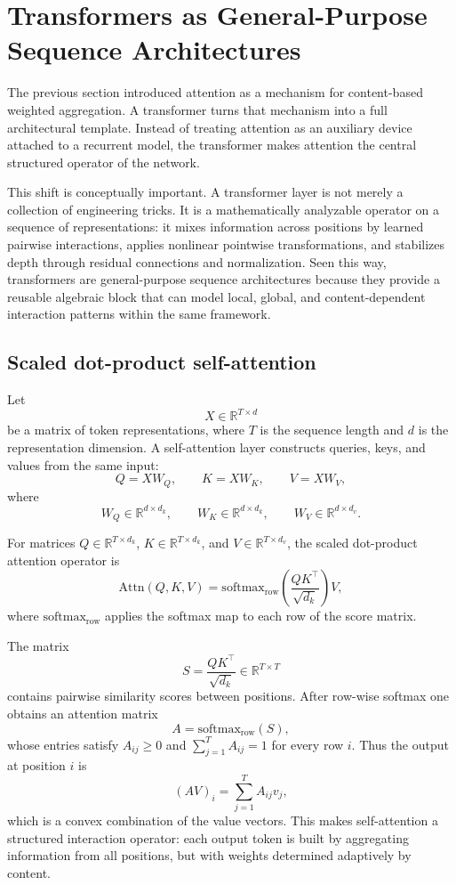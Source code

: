 \section{Transformers as General-Purpose Sequence Architectures}

The previous section introduced attention as a mechanism for content-based weighted aggregation.
A transformer turns that mechanism into a full architectural template.
Instead of treating attention as an auxiliary device attached to a recurrent model, the transformer makes attention the central structured operator of the network.

\medskip

This shift is conceptually important.
A transformer layer is not merely a collection of engineering tricks.
It is a mathematically analyzable operator on a sequence of representations:
it mixes information across positions by learned pairwise interactions, applies nonlinear pointwise transformations, and stabilizes depth through residual connections and normalization.
Seen this way, transformers are general-purpose sequence architectures because they provide a reusable algebraic block that can model local, global, and content-dependent interaction patterns within the same framework.

\subsection*{Scaled dot-product self-attention}

Let
\[
X \in \mathbb{R}^{T \times d}
\]
be a matrix of token representations, where \(T\) is the sequence length and \(d\) is the representation dimension.
A self-attention layer constructs queries, keys, and values from the same input:
\[
Q = XW_Q, \qquad K = XW_K, \qquad V = XW_V,
\]
where
\[
W_Q \in \mathbb{R}^{d \times d_k},
\qquad
W_K \in \mathbb{R}^{d \times d_k},
\qquad
W_V \in \mathbb{R}^{d \times d_v}.
\]

\begin{definition}
For matrices \(Q \in \mathbb{R}^{T \times d_k}\), \(K \in \mathbb{R}^{T \times d_k}\), and \(V \in \mathbb{R}^{T \times d_v}\), the scaled dot-product attention operator is
\[
\mathrm{Attn}(Q,K,V)
=
\mathrm{softmax}_{\mathrm{row}}\!\left(\frac{QK^{\top}}{\sqrt{d_k}}\right)V,
\]
where \(\mathrm{softmax}_{\mathrm{row}}\) applies the softmax map to each row of the score matrix.
\end{definition}

The matrix
\[
S = \frac{QK^{\top}}{\sqrt{d_k}} \in \mathbb{R}^{T \times T}
\]
contains pairwise similarity scores between positions.
After row-wise softmax one obtains an attention matrix
\[
A = \mathrm{softmax}_{\mathrm{row}}(S),
\]
whose entries satisfy \(A_{ij} \ge 0\) and \(\sum_{j=1}^T A_{ij} = 1\) for every row \(i\).
Thus the output at position \(i\) is
\[
(AV)_i = \sum_{j=1}^T A_{ij} v_j,
\]
which is a convex combination of the value vectors.
This makes self-attention a structured interaction operator:
each output token is built by aggregating information from all positions, but with weights determined adaptively by content.

